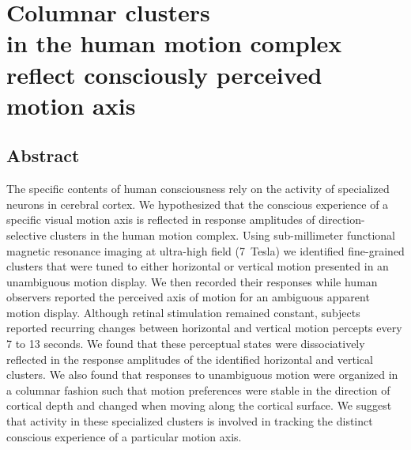 \chapter[Columnar clusters in the human motion complex\\ reflect consciously perceived motion axis]{Columnar clusters\\ in the human motion complex\\ reflect consciously perceived\\ motion axis}
\label{ch:chapter03}
\papercitetwo

\clearpage{\thispagestyle{empty}\cleardoublepage}

\section{Abstract}
The specific contents of human consciousness rely on the activity of specialized neurons in cerebral cortex. We hypothesized that the conscious experience of a specific visual motion axis is reflected in response amplitudes of direction-selective clusters in the human motion complex. Using sub-millimeter functional magnetic resonance imaging at ultra-high field (7~Tesla) we identified fine-grained clusters that were tuned to either horizontal or vertical motion presented in an unambiguous motion display. We then recorded their responses while human observers reported the perceived axis of motion for an ambiguous apparent motion display. Although retinal stimulation remained constant, subjects reported recurring changes between horizontal and vertical motion percepts every 7 to 13 seconds. We found that these perceptual states were dissociatively reflected in the response amplitudes of the identified horizontal and vertical clusters. We also found that responses to unambiguous motion were organized in a columnar fashion such that motion preferences were stable in the direction of cortical depth and changed when moving along the cortical surface. We suggest that activity in these specialized clusters is involved in tracking the distinct conscious experience of a particular motion axis.

